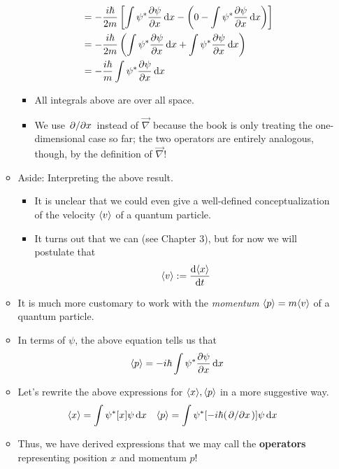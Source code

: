 \documentclass[../notes.tex]{subfiles}
\begin{document}
\begin{itemize}
\begin{itemize}
\begin{align*}
            &= -\frac{i\hbar}{2m}\left[ \int\psi^*\pdv{\psi}{x}\dd{x}-\left( 0-\int\psi^*\pdv{\psi}{x}\dd{x} \right) \right]\\
            &= -\frac{i\hbar}{2m}\left( \int\psi^*\pdv{\psi}{x}\dd{x}+\int\psi^*\pdv{\psi}{x}\dd{x}\right)\\
            &= -\frac{i\hbar}{m}\int\psi^*\pdv{\psi}{x}\dd{x}
        \end{align*}
        \begin{itemize}
            \item All integrals above are over all space.
            \item We use $\pdv*{x}$ instead of $\vec{\nabla}$ because the book is only treating the one-dimensional case so far; the two operators are entirely analogous, though, by the definition of $\vec{\nabla}$!
        \end{itemize}
        \item Aside: Interpreting the above result.
        \begin{itemize}
            \item It is unclear that we could even give a well-defined conceptualization of the velocity $\langle{v}\rangle$ of a quantum particle.
            \item It turns out that we can (see Chapter 3), but for now we will postulate that
            \begin{equation*}
                \langle{v}\rangle := \dv{\langle{x}\rangle}{t}
            \end{equation*}
        \end{itemize}
        \item It is much more customary to work with the \emph{momentum} $\langle{p}\rangle=m\langle{v}\rangle$ of a quantum particle.
        \item In terms of $\psi$, the above equation tells us that
        \begin{equation*}
            \langle{p}\rangle = -i\hbar\int\psi^*\pdv{\psi}{x}\dd{x}
        \end{equation*}
        \item Let's rewrite the above expressions for $\langle{x}\rangle,\langle{p}\rangle$ in a more suggestive way.
        \begin{align*}
            \langle{x}\rangle &= \int\psi^*[x]\psi\dd{x}&
            \langle{p}\rangle &= \int\psi^*[-i\hbar(\pdv*{x})]\psi\dd{x}
        \end{align*}
        \item Thus, we have derived expressions that we may call the \textbf{operators} representing position $x$ and momentum $p$!

\end{itemize}
\end{itemize}
\end{document}
